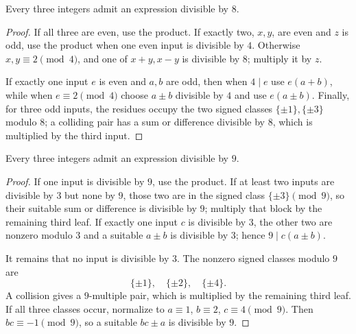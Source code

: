 \begin{theorem}\label{app:three8}
Every three integers admit an expression divisible by $8$.
\end{theorem}
\begin{proof}
If all three are even, use the product.  If exactly two, $x,y$, are even and
$z$ is odd, use the product when one even input is divisible by $4$.
Otherwise $x,y\equiv2\pmod4$, and one of $x+y,x-y$ is divisible by $8$;
multiply it by $z$.

If exactly one input $e$ is even and $a,b$ are odd, then when $4\mid e$ use
$e(a+b)$, while when $e\equiv2\pmod4$ choose $a\pm b$ divisible by $4$ and
use $e(a\pm b)$.  Finally, for three odd inputs, the residues occupy the two
signed classes $\{\pm1\},\{\pm3\}$ modulo $8$; a colliding pair has a sum
or difference divisible by $8$, which is multiplied by the third input.
\end{proof}

\begin{theorem}\label{app:three9}
Every three integers admit an expression divisible by $9$.
\end{theorem}
\begin{proof}
If one input is divisible by $9$, use the product.  If at least two inputs are
divisible by $3$ but none by $9$, those two are in the signed class
$\{\pm3\}\pmod9$, so their suitable sum or difference is divisible by $9$;
multiply that block by the remaining third leaf.  If exactly one input $c$ is
divisible by $3$, the other two are nonzero modulo $3$ and a suitable
$a\pm b$ is divisible by $3$; hence $9\mid c(a\pm b)$.

It remains that no input is divisible by $3$.  The nonzero signed classes
modulo $9$ are
\[
 \{\pm1\},\quad\{\pm2\},\quad\{\pm4\}.
\]
A collision gives a $9$-multiple pair, which is multiplied by the remaining
third leaf.  If all three classes occur, normalize to $a\equiv1$,
$b\equiv2$, $c\equiv4\pmod9$.  Then $bc\equiv-1\pmod9$, so a suitable
$bc\pm a$ is divisible by $9$.
\end{proof}

